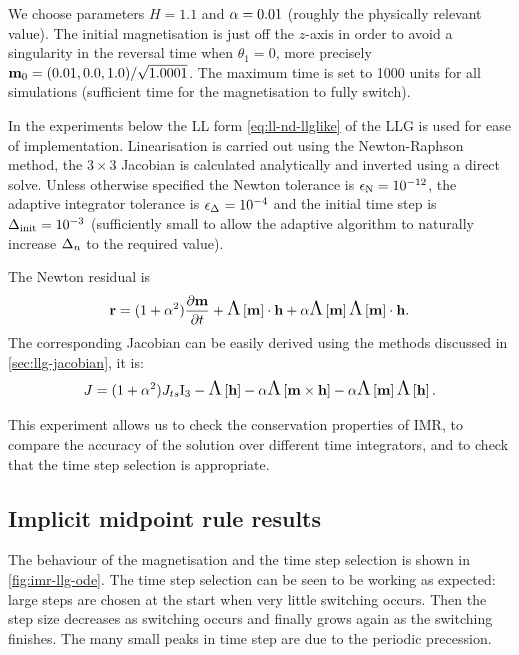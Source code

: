 We choose parameters $H = 1.1$ and $\alpha = 0.01$ (roughly the physically relevant value). 
The initial magnetisation is just off the $z$-axis in order to avoid a singularity in the reversal time when $\theta_1 = 0$, more precisely $\mathbf{m}_0 = (0.01, 0.0, 1.0)/\sqrt{1.0001}$. 
The maximum time is set to 1000 units for all simulations (sufficient time for the magnetisation to fully switch).

In the experiments below the LL form \cref{eq:ll-nd-llglike} of the LLG is used for ease of implementation.
Linearisation is carried out using the Newton-Raphson method, the $3 \times 3$ Jacobian is calculated analytically and inverted using a direct solve.
Unless otherwise specified the Newton tolerance is $\epsilon_{\text{N}} = 10^{-12}$, the adaptive integrator tolerance is $\epsilon_{\Delta_{}} = 10^{-4}$ and the initial time step is $\Delta_{\text{init}} = 10^{-3}$ (sufficiently small to allow the adaptive algorithm to naturally increase $\Delta_{n}$ to the required value).

The Newton residual is
\begin{equation}
  \mathbf{r} = (1 + \alpha^2) \frac{\partial \mathbf{m}}{\partial t} + \text{\Large{$\Lambda$}}\left[ \mathbf{m} \right] \cdot \mathbf{h} + \alpha \text{\Large{$\Lambda$}}\left[ \mathbf{m} \right]\text{\Large{$\Lambda$}}\left[ \mathbf{m} \right] \cdot \mathbf{h}.
\end{equation}
The corresponding Jacobian can be easily derived using the methods discussed in \cref{sec:llg-jacobian}, it is:
\begin{equation}
  J = (1 + \alpha^2) J_{ts} \mathrm{I}_3 - \text{\Large{$\Lambda$}}\left[ \mathbf{h} \right] - \alpha \text{\Large{$\Lambda$}}\left[  \mathbf{m} \times \mathbf{h}  \right]
  - \alpha \text{\Large{$\Lambda$}}\left[ \mathbf{m} \right] \text{\Large{$\Lambda$}}\left[ \mathbf{h} \right].
\end{equation}

This experiment allows us to check the conservation properties of IMR, to compare the accuracy of the solution over different time integrators, and to check that the time step selection is appropriate.

\subsection{Implicit midpoint rule results}

The behaviour of the magnetisation and the time step selection is shown in \cref{fig:imr-llg-ode}.
The time step selection can be seen to be working as expected: large steps are chosen at the start when very little switching occurs. Then the step size decreases as switching occurs and finally grows again as the switching finishes. 
The many small peaks in time step are due to the periodic precession.

